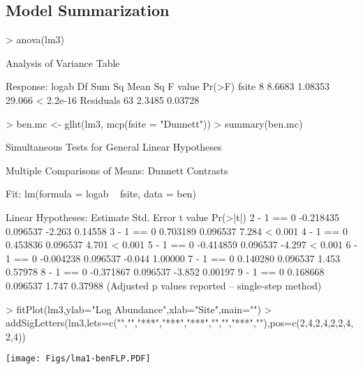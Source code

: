 \documentclass[a4paper]{article}
\begin{document}
\subsection{Model Summarization}
\begin{Schunk}
\begin{Sinput}
> anova(lm3)
\end{Sinput}
\begin{Soutput}
Analysis of Variance Table

Response: logab
          Df Sum Sq Mean Sq F value    Pr(>F)
fsite      8 8.6683 1.08353  29.066 < 2.2e-16
Residuals 63 2.3485 0.03728                  
\end{Soutput}
\begin{Sinput}
> ben.mc <- glht(lm3, mcp(fsite = "Dunnett"))
> summary(ben.mc)
\end{Sinput}
\begin{Soutput}
	 Simultaneous Tests for General Linear Hypotheses

Multiple Comparisons of Means: Dunnett Contrasts


Fit: lm(formula = logab ~ fsite, data = ben)

Linear Hypotheses:
            Estimate Std. Error t value Pr(>|t|)
2 - 1 == 0 -0.218435   0.096537  -2.263  0.14558
3 - 1 == 0  0.703189   0.096537   7.284  < 0.001
4 - 1 == 0  0.453836   0.096537   4.701  < 0.001
5 - 1 == 0 -0.414859   0.096537  -4.297  < 0.001
6 - 1 == 0 -0.004238   0.096537  -0.044  1.00000
7 - 1 == 0  0.140280   0.096537   1.453  0.57978
8 - 1 == 0 -0.371867   0.096537  -3.852  0.00197
9 - 1 == 0  0.168668   0.096537   1.747  0.37988
(Adjusted p values reported -- single-step method)
\end{Soutput}
\begin{Sinput}
> fitPlot(lm3,ylab="Log Abundance",xlab="Site",main="")
> addSigLetters(lm3,lets=c("","","***","***","***","","","***",""),pos=c(2,4,2,4,2,2,4,2,4))
\end{Sinput}
\end{Schunk}
\texttt{[image: Figs/lma1-benFLP.PDF]}
\end{document}
